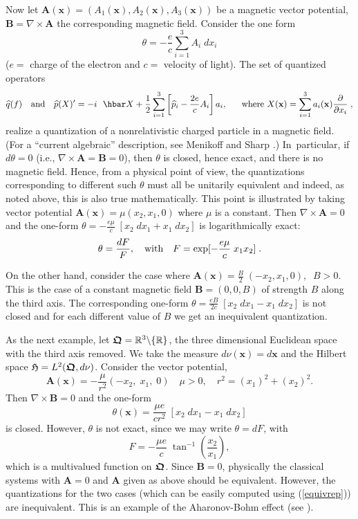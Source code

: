 \documentclass[12pt]{amsart}
\numberwithin{equation}{section}
\theoremstyle{remark}
\newcommand\HH{\mathfrak H}
\newcommand{\be}{\begin{equation}}
\newcommand{\en}{\end{equation}}
\newcommand{\bfrakQ}{\mbox{\boldmath $\mathfrak Q$}}
\newcommand{\bA}{\mathbf A}
\newcommand{\bB}{\mathbf B}
\newcommand{\bx}{\mathbf x}
\begin{document}
Now let $\bA (\bx ) = (A_1 (\bx ) , A_2 (\bx ),  A_3 (\bx ))$ be a magnetic
vector potential, $\bB = \nabla \times \bA$ the corresponding magnetic field.
Consider the one form
$$\theta = -\frac ec \sum_{i=1}^3 A_i \;dx_i$$
($e = $ charge of the electron and $c = $ velocity of light). The set of
quantized operators
\be
  \widehat{q}(f) \quad \mbox{\rm and} \quad  \widehat{p}(X)' = -i\hbar X +
  \frac 12\sum_{i=1}^3 \left[\widehat{p}_i - \frac {2e}c A_i\right]a_i , \quad
 \text{where } X(\bx ) = \sum_{i=1}^3 a_i (\bx )\frac \partial{\partial x_i}\;,
\label{quantizedops}
\en
realize a quantization of a nonrelativistic charged particle in a magnetic
field. (For a ``current algebraic'' description, see Menikoff and Sharp
\cite{bib:MenSh}.) In~particular, if $d\theta = 0$  (i.e., $\nabla \times \bA = \bB = 0$),
then $\theta$ is closed, hence exact, and there is no magnetic field. Hence,
from a physical point of view, the quantizations corresponding to different
such $\theta$ must all be unitarily equivalent and indeed, as noted above,
this is also true mathematically. This point is illustrated by taking vector
potential  $\bA (\bx ) = \mu (x_2 , x_1 , 0)$ where $\mu$ is a constant.
Then $\nabla \times \bA = 0$ and the one-form
$\theta = -\frac {e\mu}c\; [x_2\;dx_1 + x_1 \; dx_2]$
is logarithmically exact:
$$ \theta = \frac {dF}F, \quad \mbox{\rm with} \quad F =
     \exp[-\frac {e\mu}c\; x_1 x_2 ] \; . $$

     On the other hand, consider the case where $\bA (\bx ) = \frac B2\;
(-x_2 , x_1 , 0), \;\; B > 0$.
This is the case of a constant magnetic field $\bB = (0, 0, B)$ of strength $B$
along the third axis. The corresponding one-form
$\theta = \frac {eB}{2c}\; [x_2\;dx_1  -  x_1 \; dx_2]$ is not closed and for
each different value of $B$ we get an inequivalent quantization.

\bigskip

As the next example, let $\bfrakQ = {\mathbb R}^3\backslash\{\mathbb R\}$, the
three dimensional Euclidean space with the third axis removed. We take the
measure $d\nu (\bx ) = d\bx$ and the Hilbert space $\HH = L^2 (\bfrakQ, d\nu)$.
Consider the vector potential,
$$ \bA (\bx ) =  -\frac \mu {r^2}(-x_2 , \; x_1 , \; 0 )\quad \mu > 0 ,
   \quad  r^2 =  (x_1)^2 +  (x_2)^2 . $$
Then $\nabla \times \bB = 0$ and the one-form
\be
   \theta (\bx ) = \frac{\mu e}{c r^2}\;[x_2\;dx_1 -  x_1\;dx_2 ]
\label{closedoneform}
\en
is closed. However, $\theta$ is not exact, since we may write $\theta = dF$,
with
\be
   F = -\frac{\mu e}c\; \tan^{-1} \left(\frac {x_2}{x_1}\right),
\label{aharonovpot}
\en
which is a multivalued function on $\bfrakQ$. Since $\bB = 0$, physically the
classical systems with $\bA = 0$ and $\bA$ given as above should be equivalent.
However, the quantizations for the two cases (which can be easily computed
using (\ref{equivrep})) are inequivalent. This is an example of the
Aharonov-Bohm effect (see \cite{bib:-ahabohm}).
\end{document}
